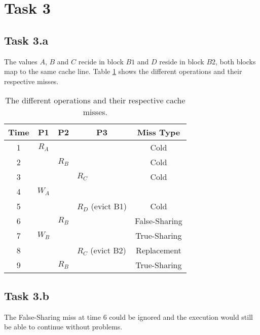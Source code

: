 \section{Task 3}
\subsection{Task 3.a}


The values $A$, $B$ and $C$ recide in block $B1$ and $D$ reside in block $B2$,
both blocks map to the same cache line. Table \ref{tab:t3a} shows the different
operations and their respective misses.

\begin{table}[]
\centering
\begin{tabular}{ccccc}
Time                   & P1    & P2    & P3                                    & Miss Type     \\ \hline
\multicolumn{1}{c|}{1} & $R_A$ &       & \multicolumn{1}{l|}{}                 & Cold          \\
\multicolumn{1}{c|}{2} &       & $R_B$ & \multicolumn{1}{l|}{}                 & Cold          \\
\multicolumn{1}{c|}{3} &       &       & \multicolumn{1}{l|}{$R_C$}            & Cold          \\
\multicolumn{1}{c|}{4} & $W_A$ &       & \multicolumn{1}{l|}{}                 &               \\
\multicolumn{1}{c|}{5} &       &       & \multicolumn{1}{l|}{$R_D$ (evict B1)} & Cold          \\
\multicolumn{1}{c|}{6} &       & $R_B$ & \multicolumn{1}{l|}{}                 & False-Sharing \\
\multicolumn{1}{c|}{7} & $W_B$ &       & \multicolumn{1}{l|}{}                 & True-Sharing  \\
\multicolumn{1}{c|}{8} &       &       & \multicolumn{1}{l|}{$R_C$ (evict B2)} & Replacement   \\
\multicolumn{1}{c|}{9} &       & $R_B$ & \multicolumn{1}{l|}{}                 & True-Sharing
\end{tabular}
\caption{The different operations and their respective cache misses.}
\label{tab:t3a}
\end{table}

\subsection{Task 3.b}
The False-Sharing miss at time $6$ could be ignored and the execution would
still be able to continue without problems.
